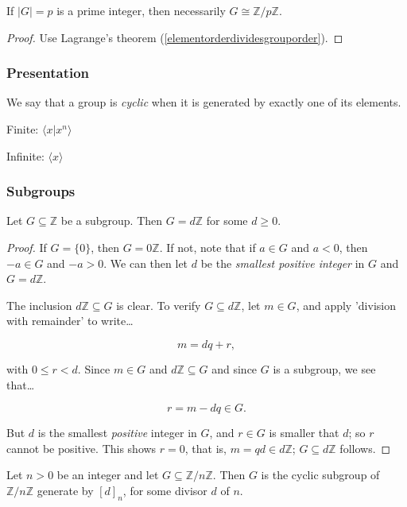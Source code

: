 \begin{proposition}
If $|G| = p$ is a prime integer, then necessarily $G \cong \mathbb{Z} / p \mathbb{Z}$.
\end{proposition}

\begin{proof}
Use Lagrange's theorem (\ref{elementorderdividesgrouporder}).
\end{proof}

\subsubsection{Presentation}
We say that a group is \emph{cyclic} when it is generated by exactly one of its elements.

\noindent Finite: $\langle x | x^n \rangle$\newline

\noindent Infinite: $\langle x \rangle$

\subsubsection{Subgroups}

\begin{proposition}
\label{infinitecyclicsubgroup}
Let $G \subseteq \mathbb{Z}$ be a subgroup. Then $G = d\mathbb{Z}$ for some $d \geq 0$.
\end{proposition}

\begin{proof}
If $G = \{ 0 \}$, then $G = 0\mathbb{Z}$. If not, note that if $a \in G$ and $a < 0$, then $-a \in G$ and $-a > 0$.
We can then let $d$ be the \emph{smallest positive integer} in $G$ and $G = d\mathbb{Z}$.

The inclusion $d\mathbb{Z} \subseteq G$ is clear. To verify $G \subseteq d\mathbb{Z}$, let $m \in G$, and apply 'division with remainder'
to write\dots

$$m = dq + r,$$

with $0 \leq r < d$. Since $m \in G$ and $d\mathbb{Z} \subseteq G$ and since $G$ is a subgroup, we see that\dots

$$r = m - dq \in G.$$

But $d$ is the smallest \emph{positive} integer in $G$, and $r \in G$ is smaller that $d$; so $r$ cannot be positive. This shows $r = 0$, that is,
$m = qd \in d\mathbb{Z}$; $G \subseteq d\mathbb{Z}$ follows.
\end{proof}

\begin{proposition}
Let $n > 0$ be an integer and let $G \subseteq \mathbb{Z}/n\mathbb{Z}$. Then $G$ is the cyclic subgroup of $\mathbb{Z}/n\mathbb{Z}$ generate by $[d]_n$,
for some divisor $d$ of $n$.
\end{proposition}

